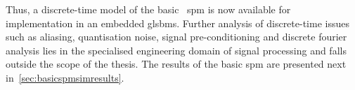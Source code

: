 Thus,  a discrete-time  model  of  the basic  ~\gls{spm}  is  now available  for
implementation in an embedded gls{bms}. Further analysis of discrete-time issues
such  as  aliasing, quantisation  noise,  signal  pre-conditioning and  discrete
fourier analysis lies in the specialised engineering domain of signal processing
and falls outside  the scope of the  thesis. The results of  the basic \gls{spm}
are presented next in~\cref{sec:basicspmsimresults}.

\FloatBarrier






